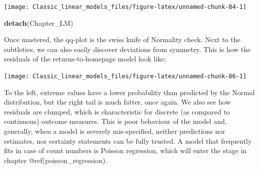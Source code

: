 \documentclass[]{svmono}
\newenvironment{Shaded}{\begin{snugshade}}{\end{snugshade}}
\newcommand{\KeywordTok}[1]{\textcolor[rgb]{0.13,0.29,0.53}{\textbf{#1}}}
\newcommand{\DataTypeTok}[1]{\textcolor[rgb]{0.13,0.29,0.53}{#1}}
\newcommand{\DecValTok}[1]{\textcolor[rgb]{0.00,0.00,0.81}{#1}}
\newcommand{\StringTok}[1]{\textcolor[rgb]{0.31,0.60,0.02}{#1}}
\newcommand{\OperatorTok}[1]{\textcolor[rgb]{0.81,0.36,0.00}{\textbf{#1}}}
\newcommand{\NormalTok}[1]{#1}
\begin{document}
\begin{Shaded}
\end{Shaded}

\texttt{[image: Classic\_linear\_models\_files/figure-latex/unnamed-chunk-84-1]}

\begin{Shaded}
\begin{Highlighting}[]
\KeywordTok{detach}\NormalTok{(Chapter_LM)}
\end{Highlighting}
\end{Shaded}

Once mastered, the qq-plot is the swiss knife of Normality check. Next
to the subtleties, we can also easily discover deviations from symmetry.
This is how the residuals of the returns-to-homepage model look like:

\begin{Shaded}
\end{Shaded}

\texttt{[image: Classic\_linear\_models\_files/figure-latex/unnamed-chunk-86-1]}

To the left, extreme values have a lower probability than predicted by
the Normal distribution, but the right tail is much fatter, once again.
We also see how residuals are clumped, which is characteristic for
discrete (as compared to continuous) outcome measures. This is poor
behaviour of the model and, generally, when a model is severely
mis-specified, neither predictions nor estimates, nor certainty
statements can be fully trusted. A model that frequently fits in case of
count numbers is Poisson regression, which will enter the stage in
chapter @ref(poisson\_regression).
\end{document}
